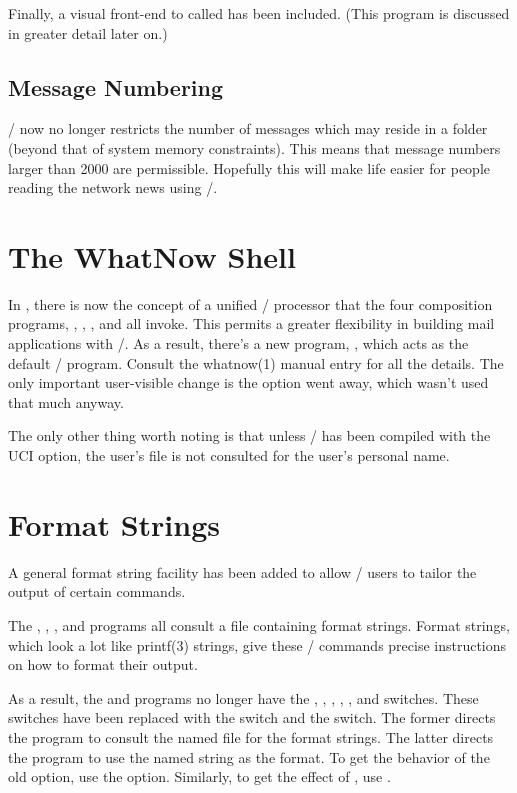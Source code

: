 Finally, a visual front-end to  called  has been included.
(This program is discussed in greater detail later on.)

\subsection*	{Message Numbering}
\MH/ now no longer restricts the number of messages which may reside in a
folder
(beyond that of system memory constraints).
This means that message numbers larger than 2000 are permissible.
Hopefully this will make life easier for people reading the network news
using \MH/.

\section*	{The WhatNow Shell}
In ,
there is now the concept of a unified \whatnow/ processor that
the four composition programs, , , ,
and  all invoke.
This permits a greater flexibility in building mail applications with \MH/.
As a result, there's a new program, , which acts as the default
\whatnow/ program.
Consult the \man whatnow(1) manual entry for all the details.
The only important user-visible change is the  option went away,
which wasn't used that much anyway.


The only other thing worth noting is that unless \MH/ has been compiled with
the UCI option,
the user's  file is not consulted for the user's
personal name.

\section*	{Format Strings}
A general format string facility has been added to allow \MH/ users to tailor
the output of certain commands.

The , , , and  programs all consult a
file containing format strings.
Format strings,
which look a lot like \man printf(3) strings,
give these \MH/ commands precise instructions on how to format their output.

As a result,
the  and  programs no longer have the
, ,
, ,
, and 
switches.
These switches have been replaced with the
 switch and the  switch.
The former directs the program to consult the named file for the format
strings.
The latter directs the program to use the named string as the format.
To get the behavior of the old  option,
use the  option.
Similarly,
to get the effect of ,
use .

